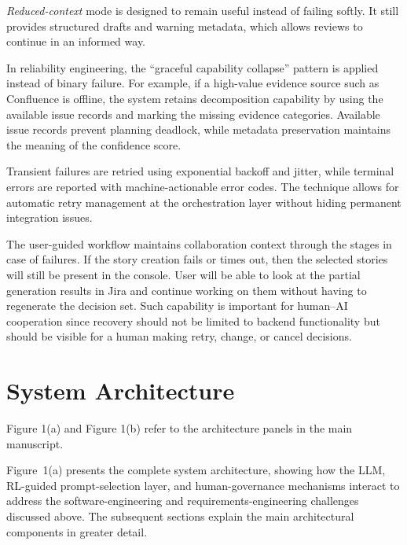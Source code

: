 \documentclass[10pt,a4paper]{article}
\begin{document}
\textit{Reduced-context} mode is designed to remain useful instead of failing softly. It still provides structured drafts and warning metadata, which allows reviews to continue in an informed way.

In reliability engineering, the ``graceful capability collapse'' pattern is applied instead of binary failure. For example, if a high-value evidence source such as Confluence is offline, the system retains decomposition capability by using the available issue records and marking the missing evidence categories. Available issue records prevent planning deadlock, while metadata preservation maintains the meaning of the confidence score.

Transient failures are retried using exponential backoff and jitter, while terminal errors are reported with machine-actionable error codes. The technique allows for automatic retry management at the orchestration layer without hiding permanent integration issues.

The user-guided workflow maintains collaboration context through the stages in case of failures. If the story creation fails or times out, then the selected stories will still be present in the console. User will be able to look at the partial generation results in Jira and continue working on them without having to regenerate the decision set. Such capability is important for human--AI cooperation since recovery should not be limited to backend functionality but should be visible for a human making retry, change, or cancel decisions.


\FloatBarrier
\section{System Architecture}
Figure 1(a) and Figure 1(b) refer to the architecture panels in the main manuscript.

Figure~1(a) presents the complete system architecture, showing how the LLM, RL-guided prompt-selection layer, and human-governance mechanisms interact to address the software-engineering and requirements-engineering challenges discussed above. The subsequent sections explain the main architectural components in greater detail.
\end{document}
